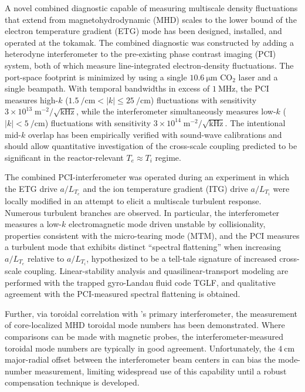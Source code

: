 %
%
%

A novel combined diagnostic capable of measuring multiscale
density fluctuations that extend from
magnetohydrodynamic (MHD) scales to
the lower bound of the electron temperature gradient (ETG) mode
has been designed, installed, and operated at the \diiid\space tokamak.
The combined diagnostic was constructed by adding a heterodyne interferometer
to the pre-existing phase contrast imaging (PCI) system,
both of which measure line-integrated electron-density fluctuations.
The port-space footprint is minimized by using
a single $\SI{10.6}{\micro\meter}$ CO$_2$ laser and
a single beampath.
With temporal bandwidths in excess of $\SI{1}{\mega\hertz}$,
the PCI measures high-$k$
($\SI{1.5}{\per\centi\meter} < |k| \leq \SI{25}{\per\centi\meter}$)
fluctuations with
sensitivity $3 \times 10^{13} \; \text{m}^{-2} / \sqrt{\text{kHz}}$, while
the interferometer simultaneously measures low-$k$
($|k| < \SI{5}{\per\centi\meter}$) fluctuations with
sensitivity $3 \times 10^{14} \; \text{m}^{-2} / \sqrt{\text{kHz}}$.
The intentional mid-$k$ overlap
has been empirically verified with sound-wave calibrations and
should allow quantitative investigation of the cross-scale coupling
predicted to be significant in the reactor-relevant $T_e \approx T_i$ regime.

The combined PCI-interferometer was operated during an experiment
in which the ETG drive $a / L_{T_e}$ and
the ion temperature gradient (ITG) drive $a / L_{T_i}$
were locally modified in an attempt to elicit
a multiscale turbulent response.
Numerous turbulent branches are observed.
In particular, the interferometer measures
a low-$k$ electromagnetic mode driven unstable by collisionality,
properties consistent with the micro-tearing mode (MTM), and
the PCI measures a turbulent mode
that exhibits distinct ``spectral flattening''
when increasing $a / L_{T_e}$ relative to $a / L_{T_i}$,
hypothesized to be a tell-tale signature
of increased cross-scale coupling.
Linear-stability analysis and quasilinear-transport modeling
are performed with the trapped gyro-Landau fluid code TGLF, and
qualitative agreement with the PCI-measured spectral flattening
is obtained.

Further, via toroidal correlation with \diiid's primary interferometer,
the measurement of core-localized MHD toroidal mode numbers
has been demonstrated.
Where comparisons can be made with magnetic probes,
the interferometer-measured toroidal mode numbers
are typically in good agreement.
Unfortunately, the $\SI{4}{\centi\meter}$ major-radial offset
between the interferometer beam centers in \diiid\space
can bias the mode-number measurement,
limiting widespread use of this capability
until a robust compensation technique is developed.
